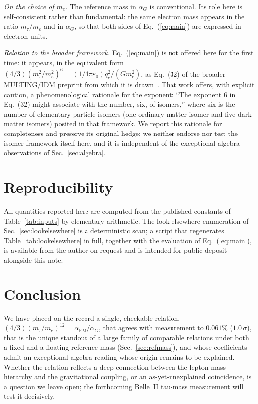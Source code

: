 \documentclass[aps,prd,twocolumn,amsmath,amssymb,floatfix,nofootinbib]{revtex4-2}
\begin{document}
\emph{On the choice of $m_e$.} The reference mass in $\alpha_G$ is
conventional. Its role here is self-consistent rather than fundamental: the
same electron mass appears in the ratio $m_\tau/m_e$ and in $\alpha_G$, so that
both sides of Eq.~(\ref{eq:main}) are expressed in electron units.

\emph{Relation to the broader framework.} Eq.~(\ref{eq:main}) is not offered
here for the first time: it appears, in the equivalent form
$(4/3)(m_\tau^2/m_e^2)^6 = (1/4\pi\varepsilon_0)q_e^2/(Gm_e^2)$, as Eq.~(32) of
the broader MULTING/IDM preprint from which it is drawn~\cite{buckholtzv6}.
That work offers, with explicit caution, a phenomenological rationale for the
exponent: ``The exponent 6 in Eq.~(32) might associate with the number, six,
of isomers,'' where six is the number of elementary-particle isomers (one
ordinary-matter isomer and five dark-matter isomers) posited in that
framework. We report this rationale for completeness and preserve its
original hedge; we neither endorse nor test the isomer framework itself
here, and it is independent of the exceptional-algebra observations of
Sec.~\ref{sec:algebra}.

\section{Reproducibility}

All quantities reported here are computed from the published constants of
Table~\ref{tab:inputs} by elementary arithmetic. The look-elsewhere enumeration
of Sec.~\ref{sec:lookelsewhere} is a deterministic scan; a script that
regenerates Table~\ref{tab:lookelsewhere} in full, together with the evaluation
of Eq.~(\ref{eq:main}), is available from the author on request and is intended
for public deposit alongside this note.

\section{Conclusion}

We have placed on the record a single, checkable relation,
$(4/3)(m_\tau/m_e)^{12} = \alpha_{\mathrm{EM}}/\alpha_G$, that agrees with
measurement to $0.061\%$ ($1.0\,\sigma$), that is the unique standout of a
large family of comparable relations under both a fixed and a floating
reference mass (Sec.~\ref{sec:refmass}), and whose coefficients admit an
exceptional-algebra reading whose origin remains to be explained. Whether the
relation reflects a deep connection between the lepton mass hierarchy and the
gravitational coupling, or an as-yet-unexplained coincidence, is a question we
leave open; the forthcoming Belle~II tau-mass measurement will test it
decisively.
\end{document}

